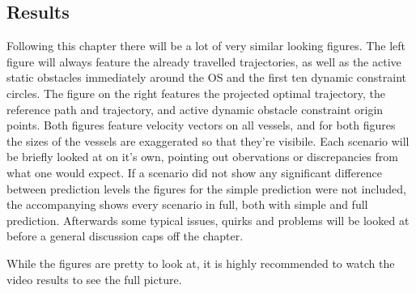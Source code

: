 \subsection{Results}
Following this chapter there will be a lot of very similar looking figures. The left figure will always feature the already travelled trajectories, %
as well as the active static obstacles immediately around the OS and the first ten dynamic constraint circles. The figure on the right features
the projected optimal trajectory, the reference path and trajectory, and active dynamic obstacle constraint origin points. Both
figures feature velocity vectors on all vessels, and for both figures the sizes of the vessels are exaggerated so that they're visibile.
Each scenario will be briefly looked at on it's own, pointing out obervations or discrepancies from what one would expect. If a scenario did not show
any significant difference between prediction levels the figures for the simple prediction were not included, the accompanying shows
every scenario in full, both with simple and full prediction. Afterwards some typical issues, quirks and problems will be looked at before a general
discussion caps off the chapter.

While the figures are pretty to look at, it is highly recommended to watch the video results to see the full picture.

